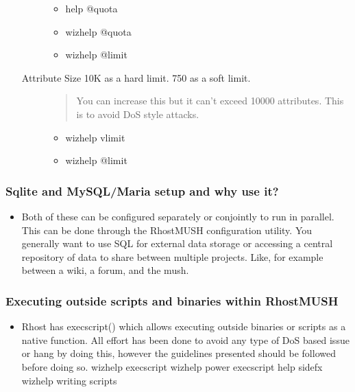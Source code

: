 \documentclass[letterpaper,10pt,english]{sphinxmanual}
\begin{document}
\begin{itemize}
\begin{description}
\begin{itemize}
\item {} 
\sphinxAtStartPar
help @quota

\item {} 
\sphinxAtStartPar
wizhelp @quota

\item {} 
\sphinxAtStartPar
wizhelp @limit

\end{itemize}

\item[{Attribute Size \sphinxhyphen{} 10K as a hard limit.  750 as a soft limit.}] \leavevmode\begin{quote}

\sphinxAtStartPar
You can increase this but it can’t exceed 10000
attributes.  This is to avoid DoS style attacks.
\end{quote}
\begin{itemize}
\item {} 
\sphinxAtStartPar
wizhelp vlimit

\item {} 
\sphinxAtStartPar
wizhelp @limit

\end{itemize}

\end{description}

\end{itemize}


\subsubsection{Sqlite and MySQL/Maria setup and why use it?}
\label{\detokenize{features:sqlite-and-mysql-maria-setup-and-why-use-it}}\begin{itemize}
\item {} 
\sphinxAtStartPar
Both of these can be configured separately or conjointly to
run in parallel.  This can be done through the RhostMUSH
configuration utility.  You generally want to use SQL for
external data storage or accessing a central repository
of data to share between multiple projects.  Like, for
example between a wiki, a forum, and the mush.

\end{itemize}


\subsubsection{Executing outside scripts and binaries within RhostMUSH}
\label{\detokenize{features:executing-outside-scripts-and-binaries-within-rhostmush}}\begin{itemize}
\item {} 
\sphinxAtStartPar
Rhost has execscript() which allows executing outside binaries
or scripts as a native function.  All effort has been done to
avoid any type of DoS based issue or hang by doing this, however
the guidelines presented should be followed before doing so.
\sphinxhyphen{} wizhelp execscript
\sphinxhyphen{} wizhelp power execscript
\sphinxhyphen{} help sidefx
\sphinxhyphen{} wizhelp writing scripts

\end{itemize}
\end{document}
